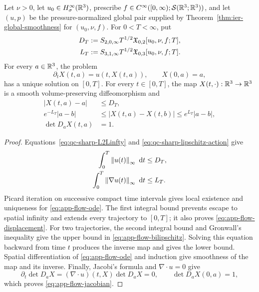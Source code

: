 \begin{theorem}
\label{thm:app-material-flow}
Let \(\nu>0\), let \(u_0\in H^\infty_\sigma(\mathbb R^3)\), prescribe
\(f\in C^\infty([0,\infty);\mathcal S(\mathbb R^3;\mathbb R^3))\), and let \((u,p)\) be
the pressure-normalized global pair supplied by
Theorem~\ref{thm:ier-global-smoothness} for \((u_0,\nu,f)\).
For \(0<T<\infty\), put
\begin{align}
 D_T&:=S_{2,0,\infty}T^{1/2}
 \mathfrak X_{0,2}[u_0,\nu,f;T],\notag\\
 L_T&:=S_{3,1,\infty}T^{1/2}
 \mathfrak X_{0,3}[u_0,\nu,f;T].
 \label{eq:app-flow-actions}
\end{align}
For every \(a\in\mathbb R^3\), the problem
\begin{equation}
 \partial_tX(t,a)=u(t,X(t,a)),
 \qquad X(0,a)=a,
 \label{eq:app-flow-ode}
\end{equation}
has a unique solution on \([0,T]\).  For every \(t\in[0,T]\), the map
\(X(t,\cdot):\mathbb R^3\to\mathbb R^3\) is a smooth volume-preserving diffeomorphism
and
\begin{align}
 |X(t,a)-a|&\le D_T,
 \label{eq:app-flow-displacement}\\
 e^{-L_T}|a-b|
 &\le|X(t,a)-X(t,b)|
 \le e^{L_T}|a-b|,
 \label{eq:app-flow-bilipschitz}\\
 \det D_aX(t,a)&=1.
 \label{eq:app-flow-jacobian}
\end{align}
\end{theorem}

\begin{proof}
Equations~\eqref{eq:qc-sharp-L2Linfty} and
\eqref{eq:qc-sharp-lipschitz-action} give
\begin{align*}
 \int_0^T\left\lVert u(t)\right\rVert_\infty\,\,\mathrm d t&\le D_T,\\
 \int_0^T\left\lVert \nabla u(t)\right\rVert_\infty\,\,\mathrm d t&\le L_T.
\end{align*}
Picard iteration on successive compact time intervals gives local
existence and uniqueness for \eqref{eq:app-flow-ode}.  The first integral
bound prevents escape to spatial infinity and extends every trajectory to
\([0,T]\); it also proves \eqref{eq:app-flow-displacement}.  For two
trajectories, the second integral bound and Gronwall's inequality give the
upper bound in \eqref{eq:app-flow-bilipschitz}.  Solving this equation
backward from time \(t\) produces the inverse map and gives the lower
bound.  Spatial differentiation of \eqref{eq:app-flow-ode} and induction
give smoothness of the map and its inverse.  Finally, Jacobi's formula and
\(\nabla\cdot u=0\) give
\[
 \partial_t\det D_aX
 =(\nabla\cdot u)(t,X)\det D_aX=0,
 \qquad \det D_aX(0,a)=1,
\]
which proves \eqref{eq:app-flow-jacobian}.
\end{proof}

